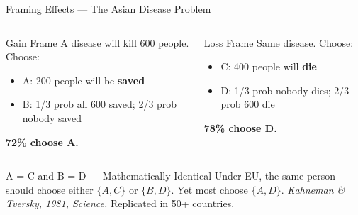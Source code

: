 \documentclass[aspectratio=169]{beamer}
\begin{document}
\begin{frame}{Framing Effects --- The Asian Disease Problem}
\begin{columns}
\begin{block}{Gain Frame}
A disease will kill 600 people. Choose:
\begin{itemize}
  \item A: 200 people will be \textbf{saved}
  \item B: 1/3 prob all 600 saved; 2/3 prob nobody saved
\end{itemize}
\textcolor{beteal}{\textbf{72\% choose A.}}
\end{block}
\begin{alertblock}{Loss Frame}
Same disease. Choose:
\begin{itemize}
  \item C: 400 people will \textbf{die}
  \item D: 1/3 prob nobody dies; 2/3 prob 600 die
\end{itemize}
\textcolor{berust}{\textbf{78\% choose D.}}
\end{alertblock}
\end{columns}
\medskip
\begin{block}{A = C and B = D --- Mathematically Identical}
Under EU, the same person should choose either $\{A, C\}$ or $\{B, D\}$. Yet most choose $\{A, D\}$.
\textit{Kahneman \& Tversky, 1981, Science.} Replicated in 50+ countries.
\end{block}
\end{frame}
\end{document}
